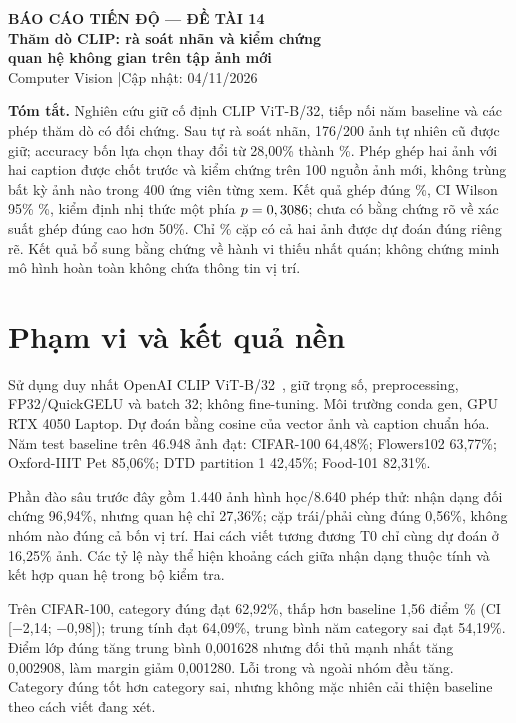 \documentclass[11pt,a4paper]{article}
\begin{document}
\begin{center}
{\large\bfseries BÁO CÁO TIẾN ĐỘ — ĐỀ TÀI 14}\\[3pt]
{\Large\bfseries Thăm dò CLIP: rà soát nhãn và kiểm chứng\\ quan hệ không gian trên tập ảnh mới}\\[4pt]
{\small Computer Vision \quad|\quad Cập nhật: 04/11/2026}
\end{center}
\textbf{Tóm tắt.} Nghiên cứu giữ cố định CLIP ViT-B/32, tiếp nối năm baseline và các phép thăm dò có đối chứng. Sau tự rà soát nhãn, 176/200 ảnh tự nhiên cũ được giữ; accuracy bốn lựa chọn thay đổi từ 28,00\% thành \OldCleanAcc\%. Phép ghép hai ảnh với hai caption được chốt trước và kiểm chứng trên 100 nguồn ảnh mới, không trùng bất kỳ ảnh nào trong 400 ứng viên từng xem. Kết quả ghép đúng \NewAcc\%, CI Wilson 95\% \NewCI\%, kiểm định nhị thức một phía $p=0,3086$; chưa có bằng chứng rõ về xác suất ghép đúng cao hơn 50\%. Chỉ \NewBoth\% cặp có cả hai ảnh được dự đoán đúng riêng rẽ. Kết quả bổ sung bằng chứng về hành vi thiếu nhất quán; không chứng minh mô hình hoàn toàn không chứa thông tin vị trí.

\section{Phạm vi và kết quả nền}
Sử dụng duy nhất OpenAI CLIP ViT-B/32~\cite{clip}, giữ trọng số, preprocessing, FP32/QuickGELU và batch 32; không fine-tuning. Môi trường conda gen, GPU RTX 4050 Laptop. Dự đoán bằng cosine của vector ảnh và caption chuẩn hóa. Năm test baseline trên 46.948 ảnh đạt: CIFAR-100 64,48\%; Flowers102 63,77\%; Oxford-IIIT Pet 85,06\%; DTD partition 1 42,45\%; Food-101 82,31\%.

Phần đào sâu trước đây gồm 1.440 ảnh hình học/8.640 phép thử: nhận dạng đối chứng 96,94\%, nhưng quan hệ chỉ 27,36\%; cặp trái/phải cùng đúng 0,56\%, không nhóm nào đúng cả bốn vị trí. Hai cách viết tương đương T0 chỉ cùng dự đoán ở 16,25\% ảnh. Các tỷ lệ này thể hiện khoảng cách giữa nhận dạng thuộc tính và kết hợp quan hệ trong bộ kiểm tra.

Trên CIFAR-100, category đúng đạt 62,92\%, thấp hơn baseline 1,56 điểm \% (CI [−2,14; −0,98]); trung tính đạt 64,09\%, trung bình năm category sai đạt 54,19\%. Điểm lớp đúng tăng trung bình 0,001628 nhưng đối thủ mạnh nhất tăng 0,002908, làm margin giảm 0,001280. Lỗi trong và ngoài nhóm đều tăng. Category đúng tốt hơn category sai, nhưng không mặc nhiên cải thiện baseline theo cách viết đang xét.
\end{document}
